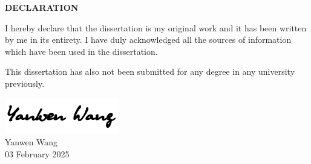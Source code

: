 \begin{center}
    {\large \textbf{DECLARATION}}
\end{center}

\vspace{3cm}

\begin{center}
    I hereby declare that the dissertation is my original work and it has
    been written by me in its entirety. I have duly
    acknowledged all the sources of information which have
    been used in the dissertation.

    \vspace{1cm}

    This dissertation has also not been submitted for any degree in any
    university previously.

    \vspace{4cm}

    \includegraphics[width=5cm]{misc./signature.png}\\[0.5cm]
    Yanwen Wang\\
    03 February 2025
\end{center}

\thispagestyle{plain}
\clearpage